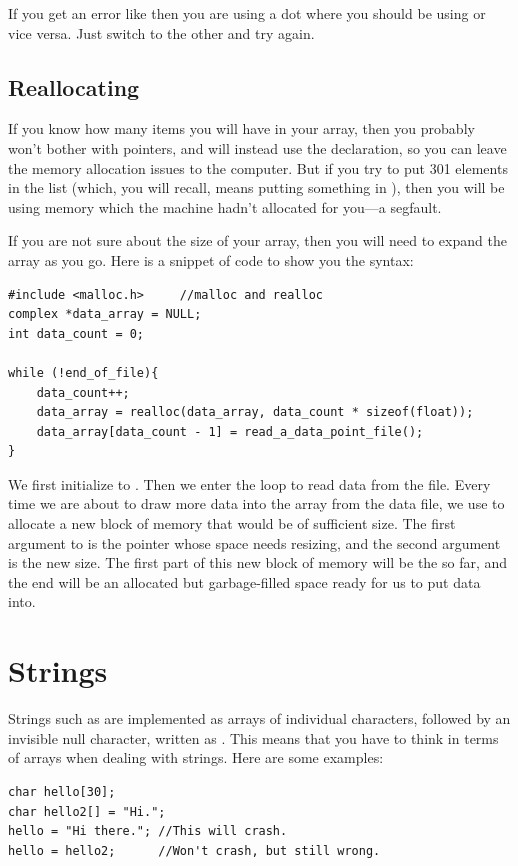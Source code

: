 \documentclass[12pt]{article}
\makeatletter
\def\cind#1{\index{#1@\ci{#1}}\ci{#1}}
\makeatother
\begin{document}
If you get an error like  then you are
using a dot where you should be using \cind{$->$} or vice versa. Just switch to the other and try again.


\subsection{Reallocating} If you know how many items you will have
in your array, then you probably won't bother with pointers, and will
instead use the  declaration, so you can leave
the memory allocation issues to the computer. But if you try to put 301
elements in the list (which, you will recall, means putting something
in ), then you will be using memory which the
machine hadn't
allocated for you---a segfault.

If you are not sure about the size of your array, then you will need to
expand the array as you go. Here is a snippet of code to show you the syntax:
\begin{lstlisting}
#include <malloc.h>     //malloc and realloc
complex *data_array = NULL;
int data_count = 0;

while (!end_of_file){
    data_count++;
    data_array = realloc(data_array, data_count * sizeof(float));
    data_array[data_count - 1] = read_a_data_point_file();
}
\end{lstlisting}

We first initialize  to .
Then
we enter the loop to read data from the file. Every time we are about to draw
more data into the array from the data file, we use \cind{realloc} to
allocate a new block of memory that would be of sufficient size. The first
argument to  is the pointer whose space needs resizing,
and the second argument is the new size.  The first part of this new
block of memory will be the  so far, and the end will
be an allocated but garbage-filled space ready for us to put data into.

\section{Strings}  \label{stringsec}

Strings such as  are implemented as arrays of individual characters, followed by an invisible
null character, written as . This means that you have to think in terms of arrays when dealing
with strings. Here are some examples:
\lstset{numbers=left, numberstyle=\scshape}
\begin{lstlisting}
char hello[30];
char hello2[] = "Hi.";
hello = "Hi there."; //This will crash.
hello = hello2;      //Won't crash, but still wrong.
\end{lstlisting}
\lstset{numbers=none}
\end{document}
